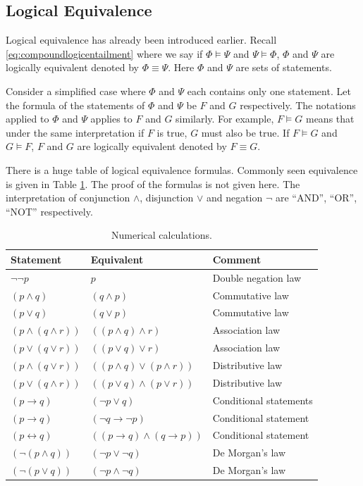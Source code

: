 \subsection{Logical Equivalence}

Logical equivalence has already been introduced earlier. Recall \eqref{eq:compoundlogicentailment} where we say if $\Phi \models \Psi$ and $\Psi \models \Phi$, $\Phi$ and $\Psi$ are logically equivalent denoted by $\Phi \equiv \Psi$. Here $\Phi$ and $\Psi$ are sets of statements.

Consider a simplified case where $\Phi$ and $\Psi$ each contains only one statement. Let the formula of the statements of $\Phi$ and $\Psi$ be $F$ and $G$ respectively. The notations applied to $\Phi$ and $\Psi$ applies to $F$ and $G$ similarly. For example, $F\models G$ means that under the same interpretation if $F$ is true, $G$ must also be true. If $F \models G$ and $G \models F$, $F$ and $G$ are logically equivalent denoted by $F\equiv G$.

There is a huge table of logical equivalence formulas. Commonly seen equivalence is given in Table \ref{tab:logicalequivalence}. The proof of the formulas is not given here. The interpretation of conjunction $\land$, disjunction $\lor$ and negation $\neg$ are ``AND'', ``OR'', ``NOT'' respectively.
\begin{table}
	\centering \caption{Numerical calculations.} \label{tab:logicalequivalence}
	\begin{tabularx}{\textwidth}{llX}
		\hline
		Statement & Equivalent & Comment \\
		\hline
		$\neg \neg p$ & $p$ & Double negation law \\
		$(p \land q)$ & $(q \land p)$ & Commutative law \\
		$(p \lor q)$ & $(q \lor p)$ & Commutative law \\
		$(p \land (q \land r))$ & $((p \land q) \land r)$ & Association law \\
		$(p \lor (q \lor r))$ & $((p \lor q) \lor r)$ & Association law \\
		$(p \land (q \lor r))$ & $((p \land q) \lor (p \land r))$ & Distributive law \\
		$(p \lor (q \land r))$ & $((p \lor q) \land (p \lor r))$ & Distributive law \\
		$(p \rightarrow q)$ & $(\neg p \lor q)$ & Conditional statements \\
		$(p \rightarrow q)$ & $(\neg q \rightarrow \neg p)$ & Conditional statement \\
		$(p \leftrightarrow q)$ & $((p \rightarrow q) \land (q \rightarrow p))$ & Conditional statement \\
		$(\neg (p \land q))$ & $(\neg p \lor \neg q)$ & De Morgan's law \\
		$(\neg (p \lor q))$ & $(\neg p \land \neg q)$ & De Morgan's law \\
		\hline
	\end{tabularx}
\end{table}

